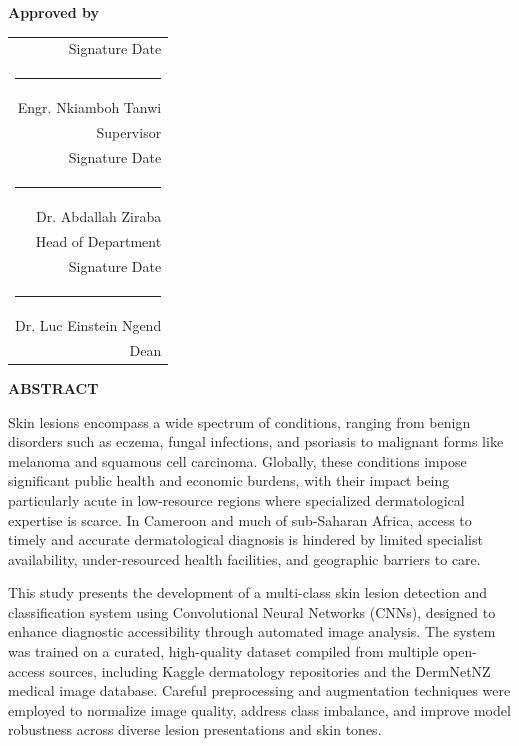 \documentclass[
  12pt,
  oneside]{article}
\begin{document}
\begin{flushright}
\textbf{Approved by}

\vspace{1.5cm}

\begin{tabular}{@{}r@{}}
Signature \hspace{3cm} Date \\ [0.5cm]
\rule{6cm}{0.15mm} \\ [0.2cm]
Engr. Nkiamboh Tanwi \\ [0.3cm]
Supervisor \\[1cm]

Signature \hspace{3cm} Date \\ [0.5cm]
\rule{6cm}{0.15mm} \\ [0.2cm]
Dr. Abdallah Ziraba \\ [0.3cm]
Head of Department \\[1cm]

Signature \hspace{3cm} Date \\ [0.5cm]
\rule{6cm}{0.15mm} \\ [0.2cm]
Dr. Luc Einstein Ngend \\ [0.3cm]
Dean \\
\end{tabular}
\end{flushright}

\vfill
\clearpage

\thispagestyle{empty}
\begin{center}
\textbf{\Large ABSTRACT}
\end{center}

\vspace{1cm}

Skin lesions encompass a wide spectrum of conditions, ranging from benign disorders such as eczema, fungal infections, and psoriasis to malignant forms like melanoma and squamous cell carcinoma. Globally, these conditions impose significant public health and economic burdens, with their impact being particularly acute in low-resource regions where specialized dermatological expertise is scarce. In Cameroon and much of sub-Saharan Africa, access to timely and accurate dermatological diagnosis is hindered by limited specialist availability, under-resourced health facilities, and geographic barriers to care. 

This study presents the development of a multi-class skin lesion detection and classification system using Convolutional Neural Networks (CNNs), designed to enhance diagnostic accessibility through automated image analysis. The system was trained on a curated, high-quality dataset compiled from multiple open-access sources, including Kaggle dermatology repositories and the DermNetNZ medical image database. Careful preprocessing and augmentation techniques were employed to normalize image quality, address class imbalance, and improve model robustness across diverse lesion presentations and skin tones.
\end{document}
